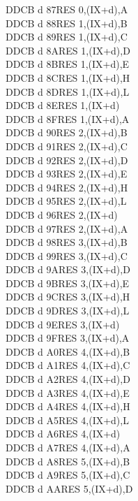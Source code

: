 \documentclass[12pt,twoside,openright,a4paper]{book}
\begin{document}
\begin{multicols}{3}
{\begin{tabbing}
	DDCB d 87\>RES 0,(IX+d),A\UNDOC\\
	DDCB d 88\>RES 1,(IX+d),B\UNDOC\\
	DDCB d 89\>RES 1,(IX+d),C\UNDOC\\
	DDCB d 8A\>RES 1,(IX+d),D\UNDOC\\
	DDCB d 8B\>RES 1,(IX+d),E\UNDOC\\
	DDCB d 8C\>RES 1,(IX+d),H\UNDOC\\
	DDCB d 8D\>RES 1,(IX+d),L\UNDOC\\
	DDCB d 8E\>RES 1,(IX+d)\\
	DDCB d 8F\>RES 1,(IX+d),A\UNDOC\\
	DDCB d 90\>RES 2,(IX+d),B\UNDOC\\
	DDCB d 91\>RES 2,(IX+d),C\UNDOC\\
	DDCB d 92\>RES 2,(IX+d),D\UNDOC\\
	DDCB d 93\>RES 2,(IX+d),E\UNDOC\\
	DDCB d 94\>RES 2,(IX+d),H\UNDOC\\
	DDCB d 95\>RES 2,(IX+d),L\UNDOC\\
	DDCB d 96\>RES 2,(IX+d)\\
	DDCB d 97\>RES 2,(IX+d),A\UNDOC\\
	DDCB d 98\>RES 3,(IX+d),B\UNDOC\\
	DDCB d 99\>RES 3,(IX+d),C\UNDOC\\
	DDCB d 9A\>RES 3,(IX+d),D\UNDOC\\
	DDCB d 9B\>RES 3,(IX+d),E\UNDOC\\
	DDCB d 9C\>RES 3,(IX+d),H\UNDOC\\
	DDCB d 9D\>RES 3,(IX+d),L\UNDOC\\
	DDCB d 9E\>RES 3,(IX+d)\\
	DDCB d 9F\>RES 3,(IX+d),A\UNDOC\\
	DDCB d A0\>RES 4,(IX+d),B\UNDOC\\
	DDCB d A1\>RES 4,(IX+d),C\UNDOC\\
	DDCB d A2\>RES 4,(IX+d),D\UNDOC\\
	DDCB d A3\>RES 4,(IX+d),E\UNDOC\\
	DDCB d A4\>RES 4,(IX+d),H\UNDOC\\
	DDCB d A5\>RES 4,(IX+d),L\UNDOC\\
	DDCB d A6\>RES 4,(IX+d)\\
	DDCB d A7\>RES 4,(IX+d),A\UNDOC\\
	DDCB d A8\>RES 5,(IX+d),B\UNDOC\\
	DDCB d A9\>RES 5,(IX+d),C\UNDOC\\
	DDCB d AA\>RES 5,(IX+d),D\UNDOC\\

\end{tabbing}}
\end{multicols}
\end{document}
